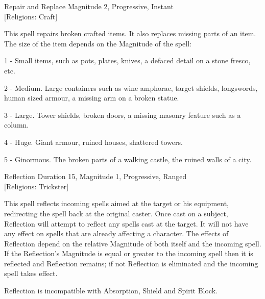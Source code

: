 \begin{rpg-spell}
{Repair and Replace}
{Magnitude 2, Progressive, Instant\\{[Religions: Craft]}}

This spell repairs broken crafted items. It also replaces missing parts of an item. The size of the item depends on the Magnitude of the spell:
\begin{rpg-list}
\item 1 - Small items, such as pots, plates, knives, a defaced detail on a stone fresco, etc.
\item 2 - Medium. Large containers such as wine amphorae, target shields, longswords, human sized armour, a missing arm on a broken statue.
\item 3 - Large. Tower shields, broken doors, a missing masonry feature such as a column.
\item 4 - Huge. Giant armour, ruined houses, shattered towers.
\item 5 - Ginormous. The broken parts of a walking castle, the ruined walls of a city.
\end{rpg-list}
\end{rpg-spell}

\begin{rpg-spell}
{Reflection}
{Duration 15, Magnitude 1, Progressive, Ranged\\{[Religions: Trickster]}}

This spell reflects incoming spells aimed at the target or his equipment, redirecting the spell back at the original caster. Once cast on a subject, Reflection will attempt to reflect any spells cast at the target. It will not have any effect on spells that are already affecting a character. The effects of Reflection depend on the relative Magnitude of both itself and the incoming spell. If the Reflection's Magnitude is equal or greater to the incoming spell then it is reflected and Reflection remains; if not Reflection is eliminated and the incoming spell takes effect. 

Reflection is incompatible with Absorption, Shield and Spirit Block.
\end{rpg-spell}

